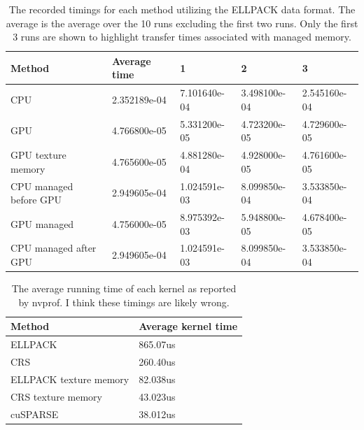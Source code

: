 \documentclass{article} \usepackage[utf8]{inputenc} \usepackage{amsmath}
\begin{document}
\begin{table}[] 
  \centering 
  \begin{tabular}{|l|l|l|l|l|} 
    \hline Method                 & Average time & 1            & 2            & 3 \\
    \hline CPU                    & 2.352189e-04 & 7.101640e-04 & 3.498100e-04 & 2.545160e-04 \\
    \hline GPU                    & 4.766800e-05 & 5.331200e-05 & 4.723200e-05 & 4.729600e-05 \\
    \hline GPU texture memory     & 4.765600e-05 & 4.881280e-04 & 4.928000e-05 & 4.761600e-05 \\
    \hline CPU managed before GPU & 2.949605e-04 & 1.024591e-03 & 8.099850e-04 & 3.533850e-04 \\
    \hline GPU managed            & 4.756000e-05 & 8.975392e-03 & 5.948800e-05 & 4.678400e-05 \\
    \hline CPU managed after GPU  & 2.949605e-04 & 1.024591e-03 & 8.099850e-04 & 3.533850e-04 \\ \hline
  \end{tabular}

  \caption{The recorded timings for each method utilizing the ELLPACK data
    format.  The average is the average over the 10 runs excluding the first two
    runs.  Only the first 3 runs are shown to highlight transfer times associated
  with managed memory.} 
\end{table}

\begin{table}[] 
  \centering 
  \begin{tabular}{|l|l|} 
    \hline Method                 & Average kernel time \\
    \hline ELLPACK                & 865.07us \\
    \hline CRS                    & 260.40us \\
    \hline ELLPACK texture memory & 82.038us \\
    \hline CRS texture memory     & 43.023us \\
    \hline cuSPARSE               & 38.012us \\ \hline
  \end{tabular}
  \caption{The average running time of each
    kernel as reported by nvprof. I think these
  timings are likely wrong.}
\end{table}
\end{document}

